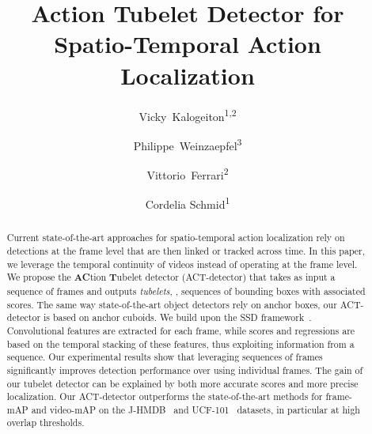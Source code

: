 \documentclass[10pt,twocolumn,letterpaper]{article}
\begin{document}
\newcommand{\argmaxsmall}{\operatornamewithlimits{argmax}}
\newcommand{\argmax}[1]{\underset{#1}{\operatorname{arg}\,\operatorname{max}}\;}
\renewcommand{\paragraph}[1]{\noindent \textbf{#1}}
\newcommand\paragraphV{\vspace{0.7mm}\paragraph}
\newcommand{\new}[1]{\textcolor{magenta}{#1}}

\title{Action Tubelet Detector for Spatio-Temporal Action Localization}

\author{Vicky~Kalogeiton\textsuperscript{1,2}
\and
Philippe~Weinzaepfel\textsuperscript{3}
\and
Vittorio~Ferrari\textsuperscript{2}
\and 
Cordelia Schmid\textsuperscript{1}
}

\maketitle
\thispagestyle{empty}

\begin{abstract}

Current state-of-the-art approaches for spatio-temporal action localization rely on detections at the frame level that are then linked or tracked across time.  In this paper, we leverage the temporal continuity of videos instead of operating at the frame level. We propose the {\bf AC}tion {\bf T}ubelet detector (ACT-detector) that takes as input a sequence of frames and outputs \textit{tubelets}, \ie, sequences of bounding boxes with associated scores. The same way state-of-the-art object detectors rely on anchor boxes, our ACT-detector is based on anchor cuboids. We build upon the SSD framework~\cite{liu16eccv}. Convolutional features are extracted for each frame, while scores and regressions are based on the temporal stacking of these features, thus exploiting information from a sequence. Our experimental results show that leveraging sequences of frames significantly improves detection performance over using individual frames. The gain of our tubelet detector can be explained by both more accurate scores and more precise localization. Our ACT-detector outperforms the state-of-the-art methods for frame-mAP and video-mAP on the J-HMDB~\cite{jhmdb} and UCF-101~\cite{ucf101} datasets, in particular at high overlap thresholds.  

\end{abstract}
\end{document}
